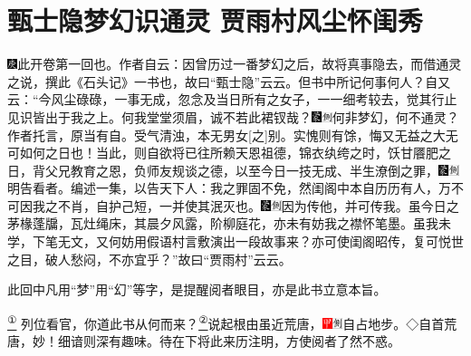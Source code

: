 

\chapter{甄士隐梦幻识通灵 贾雨村风尘怀闺秀}

{\includegraphics[width=3mm]{../Images/00004}\kaishu 此开卷第一回也。作者自云：因曾历过一番梦幻之后，故将真事隐去，而借通灵之说，撰此《石头记》一书也，故曰``甄士隐''云云。但书中所记何事何人？自又云：``今风尘碌碌，一事无成，忽念及当日所有之女子，一一细考较去，觉其行止见识皆出于我之上。何我堂堂须眉，诚不若此裙钗哉？{\includegraphics[width=3mm]{../Images/00006}\includegraphics[width=3mm]{../Images/00011}\footnotesize \kaishu 何非梦幻，何不通灵？作者托言，原当有自。受气清浊，本无男女{[}之{]}别。}实愧则有馀，悔又无益之大无可如何之日也！当此，则自欲将已往所赖天恩祖德，锦衣纨绔之时，饫甘餍肥之日，背父兄教育之恩，负师友规谈之德，以至今日一技无成、半生潦倒之罪，{\includegraphics[width=3mm]{../Images/00006}\includegraphics[width=3mm]{../Images/00011}\footnotesize \kaishu 明告看者。}编述一集，以告天下人：我之罪固不免，然闺阁中本自历历有人，万不可因我之不肖，自护己短，一并使其泯灭也。{\includegraphics[width=3mm]{../Images/00006}\includegraphics[width=3mm]{../Images/00011}\footnotesize \kaishu 因为传他，并可传我。}虽今日之茅椽蓬牖，瓦灶绳床，其晨夕风露，阶柳庭花，亦未有妨我之襟怀笔墨。虽我未学，下笔无文，又何妨用假语村言敷演出一段故事来？亦可使闺阁昭传，复可悦世之目，破人愁闷，不亦宜乎？''故曰``贾雨村''云云。

此回中凡用``梦''用``幻''等字，是提醒阅者眼目，亦是此书立意本旨。}\href{../Text/part0005_split_000.html\#lnkback_1_a}{\textsuperscript{①}}
\yahei 列位看官，你道此书从何而来？\href{../Text/part0005_split_000.html\#lnkback_2_a}{\textsuperscript{②}}说起根由虽近荒唐，{\includegraphics[width=3mm]{../Images/00002}\includegraphics[width=3mm]{../Images/00011}\footnotesize \kaishu 自占地步。◇自首荒唐，妙！}细谙则深有趣味。待在下将此来历注明，方使阅者了然不惑。

